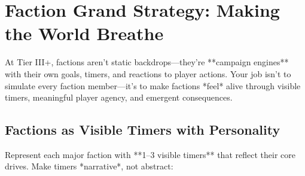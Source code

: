 \section{Faction Grand Strategy: Making the World Breathe}
\label{sec:faction-grand-strategy}

At Tier III+, factions aren't static backdrops---they're **campaign engines** with their own goals, timers, and reactions to player actions. Your job isn't to simulate every faction member---it's to make factions *feel* alive through visible timers, meaningful player agency, and emergent consequences.

\subsection*{Factions as Visible Timers with Personality}
Represent each major faction with **1--3 visible timers** that reflect their core drives. Make timers *narrative*, not abstract:

